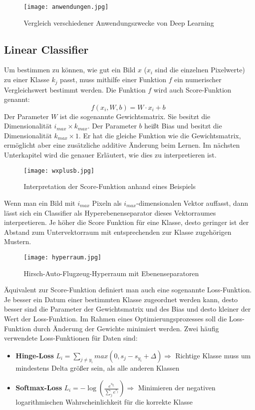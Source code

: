 \documentclass[11pt,ceqn]{book}
\begin{document}
\begin{figure}[H]
\centering
\texttt{[image: anwendungen.jpg]}
\caption{Vergleich verschiedener Anwendungszwecke von Deep Learning}
\end{figure}

\newpage
\subsection{Linear Classifier}
Um bestimmen zu können, wie gut ein Bild $x$ ($x_i$ sind die einzelnen Pixelwerte) zu einer Klasse $k_j$ passt, muss mithilfe einer Funktion $f$ ein numerischer Vergleichswert bestimmt werden. Die Funktion $f$ wird auch Score-Funktion genannt:
$$f(x_i, W, b) = W \cdot x_i + b$$
Der Parameter $W$ ist die sogenannte Gewichtsmatrix. Sie besitzt die Dimensionalität $i_{max} \times k_{max}$.
Der Parameter $b$ heißt Bias und besitzt die Dimensionalität $k_{max} \times 1$. Er hat die gleiche Funktion wie die Gewichtsmatrix, ermöglicht aber eine zusätzliche additive Änderung beim Lernen. Im nächsten Unterkapitel wird die genauer Erläutert, wie dies zu interpretieren ist.

\begin{figure}[H]
\centering
\texttt{[image: wxplusb.jpg]}
\caption{Interpretation der Score-Funktion anhand eines Beispiels}
\end{figure}

Wenn man ein Bild mit $i_{max}$ Pixeln als $i_{max}$-dimensionalen Vektor auffasst, dann lässt sich ein Classifier als Hyperebenenseparator dieses Vektorraumes interpretieren. Je höher die Score Funktion für eine Klasse, desto geringer ist der Abstand zum Untervektorraum mit entsprechenden zur Klasse zugehörigen Mustern.

\begin{figure}[H]
\centering
\texttt{[image: hyperraum.jpg]}
\caption{Hirsch-Auto-Flugzeug-Hyperraum mit Ebenenseparatoren}
\end{figure}

Äquivalent zur Score-Funktion definiert man auch eine sogenannte Loss-Funktion. Je besser ein Datum einer bestimmten Klasse zugeordnet werden kann, desto besser sind die Parameter der Gewichtsmatrix und des Bias und desto kleiner der Wert der Loss-Funktion. Im Rahmen eines Optimierungsprozesses soll die Loss-Funktion durch Änderung der Gewichte minimiert werden.
\bigskip
Zwei häufig verwendete Loss-Funktionen für Daten sind:
\begin{itemize}
\item \textbf{Hinge-Loss} $L_i = \sum\limits_{j \neq y_i} max\left(0,s_j - s_{y_i} + \Delta\right) \Rightarrow$ Richtige Klasse muss um mindestens Delta größer sein, als alle anderen Klassen
\item \textbf{Softmax-Loss} $L_i = -\log\left(\frac{e^{s_{y_i}}}{\sum_{j} e^{s_j}}\right) \Rightarrow$ Minimieren der negativen logarithmischen Wahrscheinlichkeit für die korrekte Klasse
\end{itemize}
\end{document}
